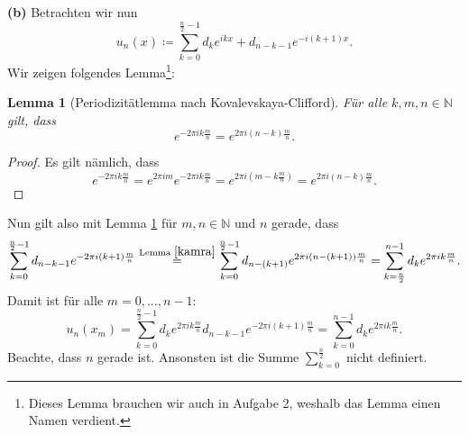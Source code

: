 \documentclass[a4paper]{extarticle}
\newtheorem{lemma}{Lemma}
\theoremstyle{named}
\begin{document}
\textbf{(b)} Betrachten wir nun 
\[
	u_n(x) \coloneqq \sum^{\frac{n}{2} -1}_{k=0} d_k e^{ikx} + d_{n-k-1}e^{-i(k+1)x}.
\]
Wir zeigen folgendes Lemma\footnote{Dieses Lemma brauchen wir auch in Aufgabe 2, weshalb das Lemma einen Namen verdient.}:
\begin{lemma}[Periodizitätlemma nach Kovalevskaya-Clifford]\label{kamra}
	Für alle $k, m,n \in \mathbb N$ gilt, dass
	\[
		e^{-2\pi i k \frac{m}{n}} = e^{2\pi i (n-k)\frac{m}{n}}.
	\]
\end{lemma}
\begin{proof}
	Es gilt nämlich, dass
	\[
		e^{-2\pi ik \frac{m}{n}} = e^{2\pi i m} e^{-2\pi ik \frac{m}{n}} = e^{2\pi i(m - k\frac{m}{n} )} = e^{2\pi i(n - k) \frac{m}{n}}.
	\]
\end{proof}

Nun gilt also mit Lemma \ref{kamra} für $m,n \in \mathbb N$ und $n$ gerade, dass
\begin{align*}
	\sum^{\frac{n}{2}-1}_{k=0}d_{n-k-1} e^{-2\pi i (k+1) \frac{m}{n}} \overset{\text{Lemma }\ref{kamra}}{=} \sum^{\frac{n}{2}-1}_{k=0} d_{n-(k+1)} e^{2\pi i (n-(k+1)) \frac{m}{n}}  = \sum^{n-1}_{k = \frac{n}{2}} d_k e^{2\pi i k \frac{m}{n}}.
\end{align*}
Damit ist für alle $m=0,...,n-1$:
\[
	u_n(x_m) = \sum^{\frac{n}{2}-1}_{k=0}d_k e^{2\pi i k \frac{m}{n}} d_{n-k-1} e^{-2\pi i (k+1) \frac{m}{n}} = \sum^{n-1}_{k = 0} d_k e^{2\pi i k \frac{m}{n}}.
\]
Beachte, dass $n$ gerade ist. Ansonsten ist die Summe $\sum^{\frac{n}{2}}_{k=0}$ nicht definiert.
\end{document}
